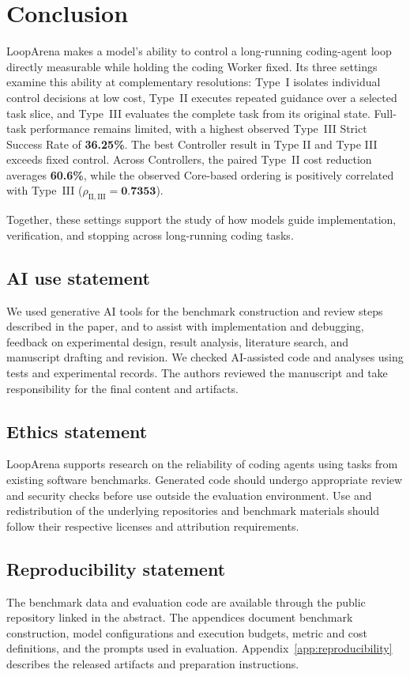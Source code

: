 \section{Conclusion}
\label{sec:conclusion}

LoopArena makes a model's ability to control a long-running coding-agent loop directly measurable while holding the coding Worker fixed. Its three settings examine this ability at complementary resolutions: Type~I isolates individual control decisions at low cost, Type~II executes repeated guidance over a selected task slice, and Type~III evaluates the complete task from its original state. Full-task performance remains limited, with a highest observed Type~III Strict Success Rate of \textbf{36.25\%}. The best Controller result in Type II and Type III exceeds fixed control. Across Controllers, the paired Type~II cost reduction averages \textbf{60.6\%}, while the observed Core-based ordering is positively correlated with Type~III (\(\rho_{\mathrm{II},\mathrm{III}}=\textbf{0.7353}\)).

Together, these settings support the study of how models guide implementation, verification, and stopping across long-running coding tasks.

\subsection*{AI use statement}

We used generative AI tools for the benchmark construction and review steps described in the paper, and to assist with implementation and debugging, feedback on experimental design, result analysis, literature search, and manuscript drafting and revision. We checked AI-assisted code and analyses using tests and experimental records. The authors reviewed the manuscript and take responsibility for the final content and artifacts.

\subsection*{Ethics statement}

LoopArena supports research on the reliability of coding agents using tasks from existing software benchmarks. Generated code should undergo appropriate review and security checks before use outside the evaluation environment. Use and redistribution of the underlying repositories and benchmark materials should follow their respective licenses and attribution requirements.

\subsection*{Reproducibility statement}

The benchmark data and evaluation code are available through the public repository linked in the abstract. The appendices document benchmark construction, model configurations and execution budgets, metric and cost definitions, and the prompts used in evaluation. Appendix~\ref{app:reproducibility} describes the released artifacts and preparation instructions.

